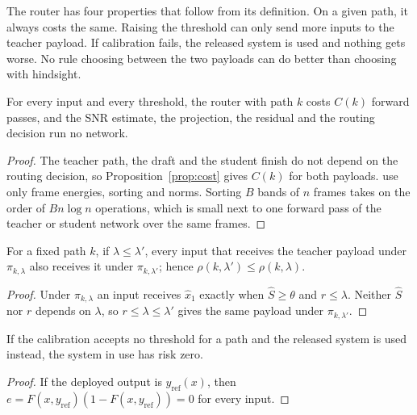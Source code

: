 The router has four properties that follow from its definition. On a given path, it always costs the same. Raising the threshold can only send more inputs to the teacher payload. If calibration fails, the released system is used and nothing gets worse. No rule choosing between the two payloads can do better than choosing with hindsight.

\begin{proposition}\label{prop:zero}
For every input and every threshold, the router with path $k$ costs $C(k)$ forward passes, and the SNR estimate, the projection, the residual and the routing decision run no network.
\end{proposition}
\begin{proof}
The teacher path, the draft and the student finish do not depend on the routing decision, so Proposition~\ref{prop:cost} gives $C(k)$ for both payloads.  use only frame energies, sorting and norms. Sorting $B$ bands of $n$ frames takes on the order of $Bn\log n$ operations, which is small next to one forward pass of the teacher or student network over the same frames.
\end{proof}

\begin{proposition}\label{prop:mono}
For a fixed path $k$, if $\lambda\le\lambda'$, every input that receives the teacher payload under $\pi_{k,\lambda}$ also receives it under $\pi_{k,\lambda'}$; hence $\rho(k,\lambda')\le\rho(k,\lambda)$.
\end{proposition}
\begin{proof}
Under $\pi_{k,\lambda}$ an input receives $\hat x_1$ exactly when $\hat S\ge\theta$ and $r\le\lambda$. Neither $\hat S$ nor $r$ depends on $\lambda$, so $r\le\lambda\le\lambda'$ gives the same payload under $\pi_{k,\lambda'}$.
\end{proof}

\begin{proposition}\label{prop:fallback}
If the calibration accepts no threshold for a path and the released system is used instead, the system in use has risk zero.
\end{proposition}
\begin{proof}
If the deployed output is $y_{\text{ref}}(x)$, then $e=F(x,y_{\text{ref}})(1-F(x,y_{\text{ref}}))=0$ for every input.
\end{proof}

